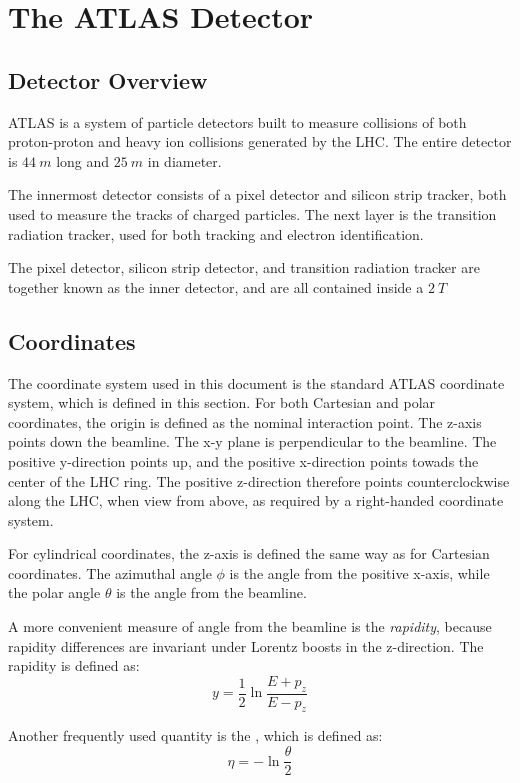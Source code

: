 \chapter{The ATLAS Detector}

\section{Detector Overview}
ATLAS is a system of particle detectors built to
measure collisions of both proton-proton and heavy ion collisions
generated by the LHC. \cite{atlas-detector-2008} The entire detector
is $44~m$ long and $25~m$ in diameter. 

The innermost detector consists
of a pixel detector and silicon strip tracker, both used to measure
the tracks of charged particles. The next layer is the transition
radiation tracker, used for both tracking and electron identification.

The pixel detector, silicon strip detector, and transition radiation
tracker are together known as the inner detector, and are all
contained inside a $2~T$

\section{Coordinates}
The coordinate system used in this document is the standard ATLAS
coordinate system, which is defined in this section. For both Cartesian and
polar coordinates, the origin is defined as the nominal interaction
point. The z-axis points down the beamline. The x-y plane is
perpendicular to the beamline. The positive y-direction points up, and
the positive x-direction points towads the center of the LHC ring. The
positive z-direction therefore points counterclockwise along the LHC,
when view from above, as required by a right-handed coordinate system.

For cylindrical coordinates, the z-axis is defined the same way as for
Cartesian coordinates. The azimuthal angle $\phi$ is the angle
from the positive x-axis, while the polar angle $\theta$ is the angle
from the beamline.

A more convenient measure of angle from the beamline is the
\textit{rapidity}, because rapidity differences are invariant under Lorentz boosts in the
z-direction. The rapidity is defined as:
\begin{equation}
y = \frac{1}{2}\ln\frac{E+p_z}{E-p_z}
\end{equation}

Another frequently used quantity is the
, which is defined as:
\begin{equation}
\eta = -\ln\frac{\theta}{2}
\end{equation}

